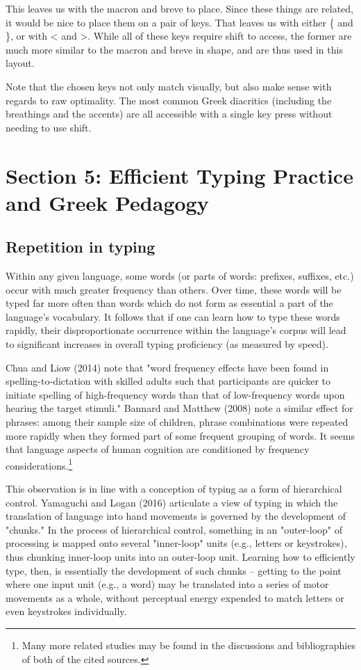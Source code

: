\documentclass[11pt]{article}
\begin{document}
This leaves us with the macron and breve to place. Since these things are related, it would be nice to place them on a pair of keys. That leaves us with either \{ and \}, or with < and >. While all of these keys require shift to access, the former are much more similar to the macron and breve in shape, and are thus used in this layout.

Note that the chosen keys not only match visually, but also make sense with regards to raw optimality. The most common Greek diacritics (including the breathings and the accents) are all accessible with a single key press without needing to use shift.

\section{Section 5: Efficient Typing Practice and Greek Pedagogy}
\label{sec:org949e595}

\subsection{Repetition in typing}
\label{sec:org2ab7d04}

Within any given language, some words (or parts of words: prefixes, suffixes, etc.) occur with much greater frequency than others. Over time, these words will be typed far more often than words which do not form as essential a part of the language's vocabulary. It follows that if one can learn how to type these words rapidly, their disproportionate occurrence within the language's corpus will lead to significant increases in overall typing proficiency (as measured by speed).

Chua and Liow (2014) note that "word frequency effects have been found in spelling-to-dictation with skilled adults such that participants are quicker to initiate spelling of high-frequency words than that of low-frequency words upon hearing the target stimuli." Bannard and Matthew (2008) note a similar effect for phrases: among their sample size of children, phrase combinations were repeated more rapidly when they formed part of some frequent grouping of words. It seems that language aspects of human cognition are conditioned by frequency considerations.\footnote{Many more related studies may be found in the discussions and bibliographies of both of the cited sources.}

This observation is in line with a conception of typing as a form of hierarchical control. Yamaguchi and Logan (2016) articulate a view of typing in which the translation of language into hand movements is governed by the development of "chunks." In the process of hierarchical control, something in an "outer-loop" of processing is mapped onto several "inner-loop" units (e.g., letters or keystrokes), thus chunking inner-loop units into an outer-loop unit. Learning how to efficiently type, then, is essentially the development of such chunks -- getting to the point where one input unit (e.g., a word) may be translated into a series of motor movements as a whole, without perceptual energy expended to match letters or even keystrokes individually.
\end{document}
